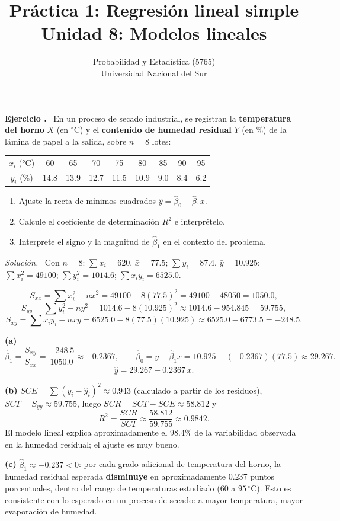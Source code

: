 \documentclass[11pt,a4paper]{article}
\title{Práctica 1: Regresión lineal simple \\ \large Unidad 8: Modelos lineales}
\author{Probabilidad y Estadística (5765) \\ Universidad Nacional del Sur}
\date{}
\newcounter{ejnum}
\newenvironment{ejercicio}{\refstepcounter{ejnum}\par\medskip\noindent\textbf{Ejercicio \theejnum.}~}{\par}
\newenvironment{solucion}{\par\noindent\textit{Solución.}~}{\par\vspace{1em}}
\begin{document}
\maketitle

\begin{ejercicio}
En un proceso de secado industrial, se registran la \textbf{temperatura del horno} $X$ (en $^\circ$C) y el \textbf{contenido de humedad residual} $Y$ (en \%) de la lámina de papel a la salida, sobre $n=8$ lotes:

\begin{table}[htbp]
\centering
\begin{tabular}{c|cccccccc}
\toprule
$x_i$ (°C) & 60 & 65 & 70 & 75 & 80 & 85 & 90 & 95 \\
$y_i$ (\%) & 14.8 & 13.9 & 12.7 & 11.5 & 10.9 & 9.0 & 8.4 & 6.2 \\
\bottomrule
\end{tabular}
\end{table}

\begin{enumerate}[label=(\alph*)]
\item Ajuste la recta de mínimos cuadrados $\hat y = \hat\beta_0+\hat\beta_1 x$.
\item Calcule el coeficiente de determinación $R^2$ e interprételo.
\item Interprete el signo y la magnitud de $\hat\beta_1$ en el contexto del problema.
\end{enumerate}
\end{ejercicio}

\begin{solucion}
Con $n=8$: $\sum x_i=620$, $\bar x=77.5$; $\sum y_i=87.4$, $\bar y=10.925$; $\sum x_i^2=49100$; $\sum y_i^2=1014.6$; $\sum x_iy_i=6525.0$.

\[
S_{xx}=\sum x_i^2-n\bar x^2 = 49100-8(77.5)^2 = 49100-48050=1050.0,
\]
\[
S_{yy}=\sum y_i^2-n\bar y^2 = 1014.6-8(10.925)^2 \approx 1014.6-954.845=59.755,
\]
\[
S_{xy}=\sum x_iy_i-n\bar x\bar y = 6525.0-8(77.5)(10.925) \approx 6525.0-6773.5=-248.5.
\]

\textbf{(a)}
\[
\hat\beta_1=\frac{S_{xy}}{S_{xx}}=\frac{-248.5}{1050.0}\approx -0.2367,
\qquad
\hat\beta_0=\bar y-\hat\beta_1\bar x = 10.925-(-0.2367)(77.5)\approx 29.267.
\]
\[
\hat y = 29.267 - 0.2367\,x.
\]

\textbf{(b)} $SCE=\sum(y_i-\hat y_i)^2\approx 0.943$ (calculado a partir de los residuos), $SCT=S_{yy}\approx59.755$, luego $SCR=SCT-SCE\approx58.812$ y
\[
R^2 = \frac{SCR}{SCT} \approx \frac{58.812}{59.755} \approx 0.9842.
\]
El modelo lineal explica aproximadamente el $98.4\%$ de la variabilidad observada en la humedad residual; el ajuste es muy bueno.

\textbf{(c)} $\hat\beta_1\approx-0.237<0$: por cada grado adicional de temperatura del horno, la humedad residual esperada \textbf{disminuye} en aproximadamente $0.237$ puntos porcentuales, dentro del rango de temperaturas estudiado ($60$ a $95\,^\circ$C). Esto es consistente con lo esperado en un proceso de secado: a mayor temperatura, mayor evaporación de humedad.
\end{solucion}
\end{document}
